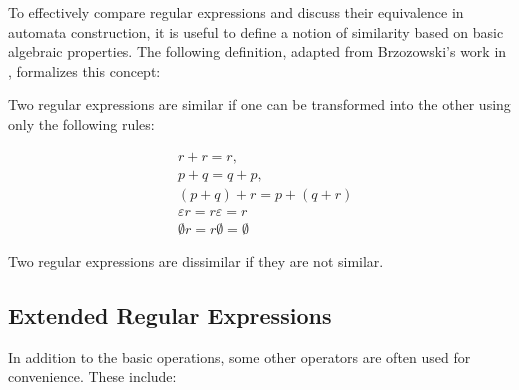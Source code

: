To effectively compare regular expressions and discuss their equivalence in automata construction, it is useful to define a notion of similarity based on basic algebraic properties. The following definition, adapted from Brzozowski's work in \cite{brzozowski_derivatives}, formalizes this concept:
\begin{defn} 
	Two regular expressions are similar if one can be transformed into the other using only the following rules:
	
	\begin{align*}
		& r + r = r, \\
		& p + q = q + p, \\
		& (p + q) + r = p + (q + r) \\
		& \varepsilon r = r \varepsilon = r \\
		& \emptyset r = r \emptyset = \emptyset
	\end{align*}
	
	Two regular expressions are dissimilar if they are not similar.
\end{defn}







	
\subsection{Extended Regular Expressions}
\label{chap:prelim:extended_re}
In addition to the basic operations, some other operators are often used for convenience. These include:

